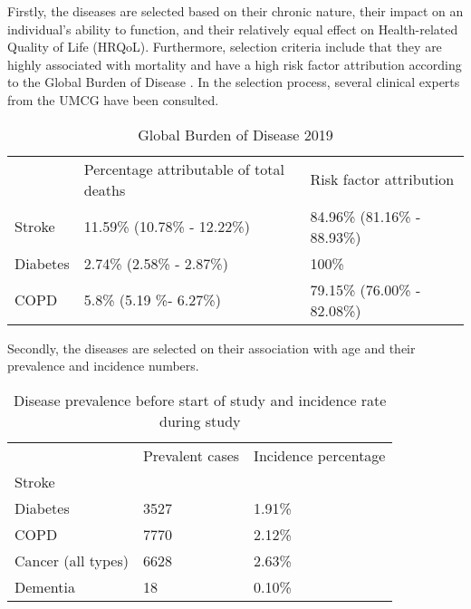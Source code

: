 Firstly, the diseases are selected based on their chronic nature, their impact on an individual's ability to function, and their relatively equal effect on Health-related Quality of Life (HRQoL). Furthermore, selection criteria include that they are highly associated with mortality and have a high risk factor attribution according to the Global Burden of Disease \citep{GBD}. %
In the selection process, several clinical experts from the UMCG have been consulted. 
\vspace{0.5cm}
\begin{table}[H]
    \centering
    \caption{Global Burden of Disease 2019}
    \begin{tabular}{lll}
    \cline{1-3}
             & Percentage attributable of total deaths & Risk factor attribution     \\ \cline{1-3}
    Stroke   & 11.59\% (10.78\% - 12.22\%)             & 84.96\% (81.16\% - 88.93\%) \\
    Diabetes & 2.74\% (2.58\% - 2.87\%)                & 100\%                       \\
    COPD     & 5.8\% (5.19 \%- 6.27\%)                 & 79.15\% (76.00\% - 82.08\%) 
    \end{tabular}
    \label{table:data:global_burden_of_disease}
\end{table}
Secondly, the diseases are selected on their association with age and their prevalence and incidence numbers. 
\vspace{0.5cm}
\begin{table} [H]
    \centering
    \caption{Disease prevalence before start of study and incidence rate during study}
    \begin{tabular}{lll}
    \cline{1-3}
                       & Prevalent cases & Incidence percentage\\ \cline{1-3}
    Stroke             &                 &                    \\
    Diabetes           & 3527            & 1.91\%             \\
    COPD               & 7770            & 2.12\%              \\
    Cancer (all types) & 6628            & 2.63\%              \\
    Dementia           & 18              & 0.10\%             
    \end{tabular}
    \label{table:data:disease_prevalence_incidence}
\end{table} 

